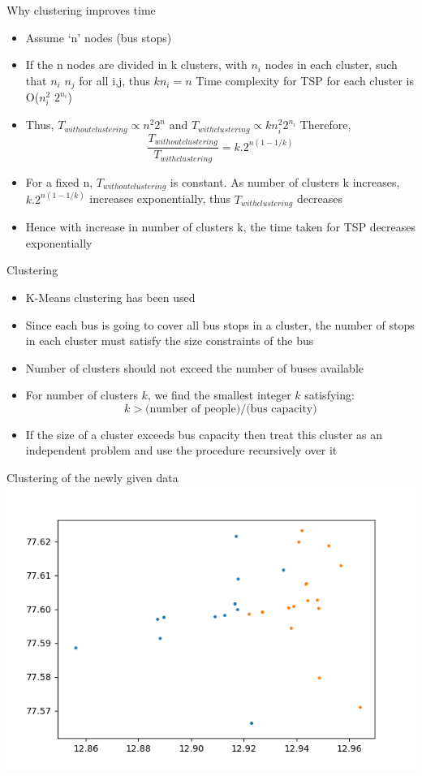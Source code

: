 \documentclass{beamer}
\begin{document}
\begin{frame}{Why clustering improves time}
\begin{itemize}[<+- | alert@+>]
\item Assume ‘n’ nodes (bus stops)
\item If the n nodes are divided in k clusters, with $n_i$
nodes in each cluster, such that
$n_i$ \approx  $ n_j$ for all i,j, thus $kn_i = n$
Time complexity for TSP for each cluster is O($n_i^2$ $2^{n_i}$)
\item Thus,  $T_{without clustering} \propto n^2 2^n$ and $T_{with clustering} \propto kn_i^2 2^{n_i}$
Therefore,  \[ \frac{T_{without clustering}}{T_{with clustering}} = {k.2^{n(1-1/k)}}    \]
\item For a fixed n, $T_{without clustering}$ is constant. As number of clusters k increases, ${k.2^{n(1-1/k)}}$ increases exponentially, thus $T_{with clustering}$ decreases
\item Hence with increase in number of clusters k, the time taken for TSP decreases exponentially 

\end{itemize}
\end{frame}

\begin{frame}{Clustering}
\begin{itemize}[<+- | alert@+>]
\item K-Means clustering has been used
\item Since each bus is going to cover all bus stops in a cluster, the number of stops in each cluster must satisfy the size constraints of the bus
\item Number of clusters should not exceed the number of buses available
\item For number of clusters $k$, we find the smallest integer $k$ satisfying:
\[ k> \text{(number of people)} / \text{(bus capacity)}\]

\item If the size of a cluster exceeds bus capacity then treat this cluster as an independent problem and use the procedure recursively over it
\end{itemize}
\end{frame}
\begin{frame}{Clustering of the newly given data}
\includegraphics[width=\textwidth]{clustering_image.png}
\end{frame}
\end{document}
